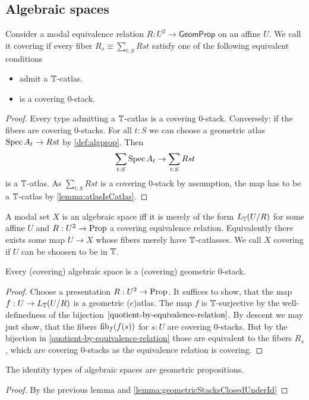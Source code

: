 \subsection{Algebraic spaces}
\begin{definition}{\label{def:coveringEqRel}}
		Consider a modal equivalence relation $R : U^2 \to \mathsf{GeomProp}$ on an affine $U$. We call it covering if every fiber $R_s \equiv \sum_{t: S} R s t$ satisfy one of the following equivalent conditions
		\begin{itemize}
			\item admit a $\mathbb{T}$-catlas.
			\item is a covering 0-stack.
\end{itemize}
\end{definition}
\begin{proof}
Every type admitting a $\mathbb{T}$-catlas is a covering 0-stack. 
Conversely: if the fibers are covering 0-stacks. For all $t : S$ we can choose a geometric atlas $\operatorname{Spec} A_t \to R s t$ by \ref{def:algprop}. Then 
\[
\sum_{t:S} \operatorname{Spec} A_t \to \sum_{t : S} R s t
\]
is a $\mathbb{T}$-atlas. As $\sum_{t : S} R s t$ is a covering 0-stack by assumption, the map has to be a $\mathbb{T}$-catlas by \ref{lemma:atlasIsCatlas}. 
\end{proof}


\begin{definition}
	A modal set $X$ is an algebraic space iff it is merely of the form $L_{\mathbb{T}} (U / R)$ for some affine $U$ and  $R : U^2 \to \operatorname{Prop}$ a covering equivalence relation. Equivalently there exists some map $U \to X$ whose fibers merely have $\mathbb{T}$-catlasses. We call $X$ covering if $U$ can be choosen to be in $\mathbb{T}$.
\end{definition}
\begin{lemma}
	Every (covering) algebraic space is a (covering) geometric 0-stack.

\end{lemma}
\begin{proof}
	Choose a presentation $ R: U^2 \to \operatorname{Prop}$.
	It suffices to show, that the map $f : U \to L_{\mathbb{T}} ( U / R)$ is a geometric (c)atlas. The map $f$ is $\mathbb{T}$-surjective by the well-definedness of the bijection $\ref{quotient-by-equivalence-relation}$. By descent we may just show, that the fibers $\operatorname{fib}_f (f(s))$ for $s : U$ are covering 0-stacks. But by the bijection in \ref{quotient-by-equivalence-relation} those are equivalent to the fibers $R_s$, which are covering 0-stacks as the equivalence relation is covering.
\end{proof}
\begin{corollary}
	The identity types of algebraic spaces are geometric propositions.
\end{corollary}
\begin{proof}
	By the previous lemma and \ref{lemma:geometricStacksClosedUnderId}
\end{proof}


